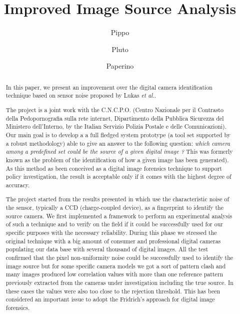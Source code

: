 \documentclass[runningheads,11pt]{llncs}
\begin{document}
\title{Improved Image Source Analysis}
%
\author{ Pippo \and Pluto \and Paperino}

\maketitle
\begin{abstract}

In this paper, we present an improvement over the digital camera
identification technique based on sensor noise proposed by Lukas
\emph{et al.}\cite{Fri06}.

The project is a joint work with the C.N.C.P.O.  (Centro Nazionale
per il Contrasto della Pedopornografia sulla rete internet,
Dipartimento della Pubblica Sicurezza del Ministero dell'Interno, by
the Italian Servizio Polizia Postale e delle Comunicazioni). Our
main goal is to develop a a full fledged system prototype (a tool
set supported by a robust methodology) able to give an answer to the
following question: {\em which camera among a predefined set could
be the source of a given digital image ?} This was formerly known as
the problem of the identification of how a given image has been
generated). As this method as been conceived as a digital image
forensics technique to support policy investigation, the result is
acceptable only if it comes with the highest degree of accuracy.

The project started from the results presented in \cite{Fri06} which
use the characteristic noise of the sensor, typically a CCD
(charge-coupled device), as a fingerprint to identify the source
camera. We first implemented a framework to perform an experimental
analysis of such a technique and to verify on the field if it could
be successfully used for our specific purposes with the necessary
reliability. During this phase we stressed the original technique
with a big amount of consumer and professional digital cameras
populating our data base with several thousand of digital images.
All the test confirmed that the pixel non-uniformity noise could be
successfully used to identify the image source but for some specific
camera models we got a sort of pattern clash and many images
produced low correlation values with more than one reference pattern
previously extracted from the cameras under investigation including
the true source. In these cases the values were also too close to
the rejection threshold. This has been considered an important issue
to adopt the Fridrich's approach for digital image forensics.


\end{abstract}
\end{document}
